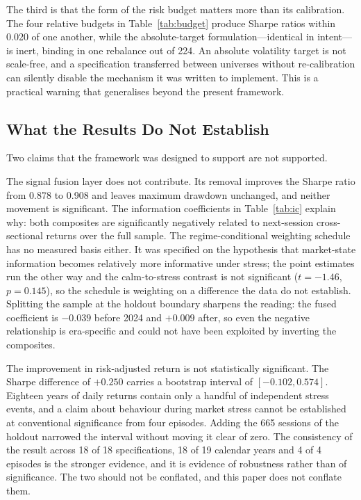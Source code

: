 \documentclass{singlecol-new}
\theoremstyle{TH}{
\newtheorem{lemma}{Lemma}
\newtheorem{theorem}[lemma]{Theorem}
\newtheorem{corrolary}[lemma]{Corrolary}
\newtheorem{conjecture}[lemma]{Conjecture}
\newtheorem{proposition}[lemma]{Proposition}
\newtheorem{claim}[lemma]{Claim}
\newtheorem{stheorem}[lemma]{Wrong Theorem}
\newtheorem{algorithm}{Algorithm}
}
\theoremstyle{THrm}{
\newtheorem{definition}{Definition}[section]
\newtheorem{question}{Question}[section]
\newtheorem{remark}{Remark}
\newtheorem{scheme}{Scheme}
}
\theoremstyle{THhit}{
\newtheorem{case}{Case}[section]
}
\begin{document}
The third is that the form of the risk budget matters more than its calibration. The
four relative budgets in Table~\ref{tab:budget} produce Sharpe ratios within 0.020 of one another,
while the absolute-target formulation---identical in intent---is inert, binding in one
rebalance out of 224. An absolute volatility target is not scale-free, and a
specification transferred between universes without re-calibration can silently disable
the mechanism it was written to implement. This is a practical warning that generalises
beyond the present framework.

\subsection{What the Results Do Not Establish}

Two claims that the framework was designed to support are not supported.

The signal fusion layer does not contribute. Its removal improves the Sharpe ratio from
0.878 to 0.908 and leaves maximum drawdown unchanged, and neither movement is
significant. The information coefficients in Table~\ref{tab:ic} explain why: both composites are
significantly negatively related to next-session cross-sectional returns over the full
sample. The regime-conditional weighting schedule has no measured basis either. It was
specified on the hypothesis that market-state information becomes relatively more
informative under stress; the point estimates run the other way and the calm-to-stress
contrast is not significant ($t = -1.46$, $p = 0.145$), so the schedule is weighting on a
difference the data do not establish. Splitting the sample at the holdout boundary
sharpens the reading: the fused coefficient is $-0.039$ before 2024 and $+0.009$ after,
so even the negative relationship is era-specific and could not have been exploited by
inverting the composites.

The improvement in risk-adjusted return is not statistically significant. The Sharpe
difference of $+0.250$ carries a bootstrap interval of $[-0.102, 0.574]$. Eighteen years
of daily returns contain only a handful of independent stress events, and a claim about
behaviour during market stress cannot be established at conventional significance from
four episodes. Adding the 665 sessions of the holdout narrowed the interval without
moving it clear of zero. The consistency of the result across 18 of 18 specifications,
18 of 19 calendar years and 4 of 4 episodes is the stronger evidence, and it is evidence of
robustness rather than of significance. The two should not be conflated, and this paper
does not conflate them.
\end{document}
